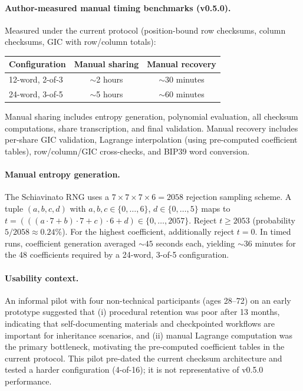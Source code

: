 \documentclass[11pt]{article}
\begin{document}
\paragraph{Author-measured manual timing benchmarks (v0.5.0).} Measured under the current protocol (position-bound row checksums, column checksums, GIC with row/column totals):

\begin{center}
\small
\begin{tabular}{@{}lcc@{}}
\toprule
\textbf{Configuration} & \textbf{Manual sharing} & \textbf{Manual recovery} \\ \midrule
12-word, 2-of-3 & $\sim$2 hours & $\sim$30 minutes \\
24-word, 3-of-5 & $\sim$5 hours & $\sim$60 minutes \\
\bottomrule
\end{tabular}
\end{center}

Manual sharing includes entropy generation, polynomial evaluation, all checksum computations, share transcription, and final validation. Manual recovery includes per-share GIC validation, Lagrange interpolation (using pre-computed coefficient tables), row/column/GIC cross-checks, and BIP39 word conversion.

\paragraph{Manual entropy generation.} The Schiavinato RNG uses a $7 \times 7 \times 7 \times 6 = 2058$ rejection sampling scheme. A tuple $(a, b, c, d)$ with $a, b, c \in \{0, \ldots, 6\}$, $d \in \{0, \ldots, 5\}$ maps to $t = (((a \cdot 7 + b) \cdot 7 + c) \cdot 6 + d) \in \{0, \ldots, 2057\}$. Reject $t \geq 2053$ (probability $5/2058 \approx 0.24\%$). For the highest coefficient, additionally reject $t = 0$. In timed runs, coefficient generation averaged ${\sim}45$ seconds each, yielding ${\sim}36$ minutes for the 48 coefficients required by a 24-word, 3-of-5 configuration.

\paragraph{Usability context.} An informal pilot with four non-technical participants (ages 28--72) on an early prototype suggested that (i) procedural retention was poor after 13 months, indicating that self-documenting materials and checkpointed workflows are important for inheritance scenarios, and (ii) manual Lagrange computation was the primary bottleneck, motivating the pre-computed coefficient tables in the current protocol. This pilot pre-dated the current checksum architecture and tested a harder configuration (4-of-16); it is not representative of v0.5.0 performance.
\end{document}
